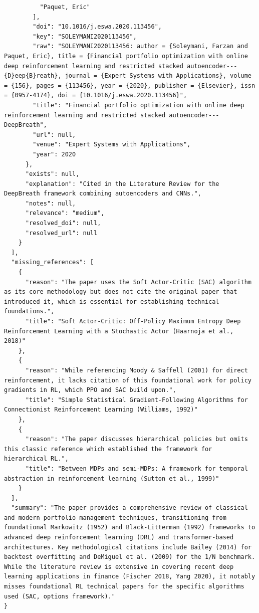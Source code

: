 \documentclass[11pt]{article}
\begin{document}
\begin{verbatim}
          "Paquet, Eric"
        ],
        "doi": "10.1016/j.eswa.2020.113456",
        "key": "SOLEYMANI2020113456",
        "raw": "SOLEYMANI2020113456: author = {Soleymani, Farzan and Paquet, Eric}, title = {Financial portfolio optimization with online deep reinforcement learning and restricted stacked autoencoder---{D}eep{B}reath}, journal = {Expert Systems with Applications}, volume = {156}, pages = {113456}, year = {2020}, publisher = {Elsevier}, issn = {0957-4174}, doi = {10.1016/j.eswa.2020.113456}",
        "title": "Financial portfolio optimization with online deep reinforcement learning and restricted stacked autoencoder---DeepBreath",
        "url": null,
        "venue": "Expert Systems with Applications",
        "year": 2020
      },
      "exists": null,
      "explanation": "Cited in the Literature Review for the DeepBreath framework combining autoencoders and CNNs.",
      "notes": null,
      "relevance": "medium",
      "resolved_doi": null,
      "resolved_url": null
    }
  ],
  "missing_references": [
    {
      "reason": "The paper uses the Soft Actor-Critic (SAC) algorithm as its core methodology but does not cite the original paper that introduced it, which is essential for establishing technical foundations.",
      "title": "Soft Actor-Critic: Off-Policy Maximum Entropy Deep Reinforcement Learning with a Stochastic Actor (Haarnoja et al., 2018)"
    },
    {
      "reason": "While referencing Moody & Saffell (2001) for direct reinforcement, it lacks citation of this foundational work for policy gradients in RL, which PPO and SAC build upon.",
      "title": "Simple Statistical Gradient-Following Algorithms for Connectionist Reinforcement Learning (Williams, 1992)"
    },
    {
      "reason": "The paper discusses hierarchical policies but omits this classic reference which established the framework for hierarchical RL.",
      "title": "Between MDPs and semi-MDPs: A framework for temporal abstraction in reinforcement learning (Sutton et al., 1999)"
    }
  ],
  "summary": "The paper provides a comprehensive review of classical and modern portfolio management techniques, transitioning from foundational Markowitz (1952) and Black-Litterman (1992) frameworks to advanced deep reinforcement learning (DRL) and transformer-based architectures. Key methodological citations include Bailey (2014) for backtest overfitting and DeMiguel et al. (2009) for the 1/N benchmark. While the literature review is extensive in covering recent deep learning applications in finance (Fischer 2018, Yang 2020), it notably misses foundational RL technical papers for the specific algorithms used (SAC, options framework)."
}
\end{verbatim}
\end{document}
